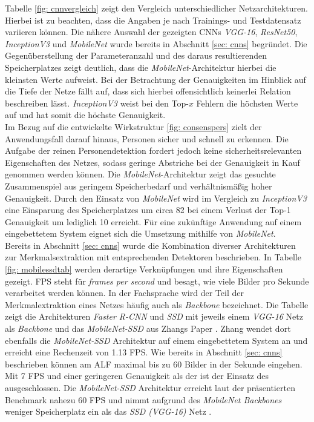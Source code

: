 		
		
			
		
		Tabelle \ref{fig: cnnvergleich} zeigt den Vergleich unterschiedlicher Netzarchitekturen. Hierbei ist zu beachten, dass die Angaben je nach Trainings- und Testdatensatz variieren können. Die nähere Auswahl der gezeigten CNNs \textit{VGG-16}, \textit{ResNet50}, \textit{InceptionV3} und \textit{MobileNet} wurde bereits in Abschnitt \ref{sec: cnns} begründet. Die Gegenüberstellung der Parameteranzahl und des daraus resultierenden Speicherplatzes zeigt deutlich, dass die \textit{MobileNet}-Architektur hierbei die kleinsten Werte aufweist. Bei der Betrachtung der Genauigkeiten im Hinblick auf die Tiefe der Netze fällt auf, dass sich hierbei offensichtlich keinerlei Relation beschreiben lässt. \textit{InceptionV3} weist bei den Top-$x$ Fehlern die höchsten Werte auf und hat somit die höchste Genauigkeit.\\
		
		Im Bezug auf die entwickelte Wirkstruktur \ref{fig: consenspers} zielt der Anwendungsfall darauf hinaus, Personen sicher und schnell zu erkennen. Die Aufgabe der reinen Personendetektion fordert jedoch keine sicherheitsrelevanten Eigenschaften des Netzes, sodass geringe Abstriche bei der Genauigkeit in Kauf genommen werden können. Die \textit{MobileNet}-Architektur zeigt das gesuchte Zusammenspiel aus geringem Speicherbedarf und verhältnismäßig hoher Genauigkeit. Durch den Einsatz von \textit{MobileNet} wird im Vergleich zu \textit{InceptionV3} eine Einsparung des Speicherplatzes um circa 82 \percent\text{ }bei einem Verlust der Top-1 Genauigkeit um lediglich 10 \percent\textit{ }erreicht. Für eine zukünftige Anwendung auf einem eingebettetem System eignet sich die Umsetzung mithilfe von \textit{MobileNet}.\\
		
		
		
		Bereits in Abschnitt \ref{sec: cnns} wurde die Kombination diverser Architekturen zur Merkmalsextraktion mit entsprechenden Detektoren beschrieben. In Tabelle \ref{fig: mobilessdtab} werden derartige Verknüpfungen und ihre Eigenschaften gezeigt. FPS steht für \textit{frames per second} und besagt, wie viele Bilder pro Sekunde verarbeitet werden können. In der Fachsprache wird der Teil der Merkmalextraktion eines Netzes häufig auch als \textit{Backbone} bezeichnet. Die Tabelle zeigt die Architekturen \textit{Faster R-CNN} und \textit{SSD} mit jeweils einem \textit{VGG-16} Netz als \textit{Backbone} und das \textit{MobileNet-SSD} aus Zhangs Paper \cite{embedded}. Zhang wendet dort ebenfalls die \textit{MobileNet-SSD} Architektur auf einem eingebettetem System an und erreicht eine Rechenzeit von 1.13 FPS. Wie bereits in Abschnitt \ref{sec: cnns} beschrieben können am ALF maximal bis zu 60 Bilder in der Sekunde eingehen. Mit 7 FPS und einer geringeren Genauigkeit als der  ist der Einsatz des  ausgeschlossen. Die \textit{MobileNet-SSD} Architektur erreicht laut der präsentierten Benchmark nahezu 60 FPS und nimmt aufgrund des \textit{MobileNet Backbones} weniger Speicherplatz ein als das \textit{SSD (VGG-16)} Netz \cite{leightweight}. \\ 
		
